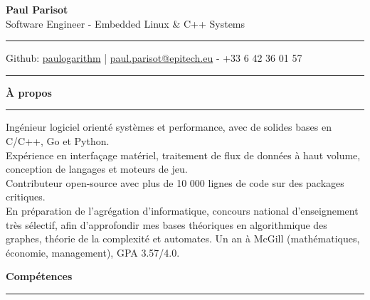 \documentclass[9pt]{extarticle}
\begin{document}
\begin{center}
    {\huge\bfseries Paul Parisot}
    \\[3pt]
    {\Large Software Engineer - Embedded Linux \& C++ Systems}
    \\[5pt]
\end{center}

\par\vspace{-10pt}
\rule{\linewidth}{0.4pt}
\par\vspace{-4pt}

\begin{center}
    Github: \href{https://github.com/paulogarithm}{paulogarithm} 
    \quad | \quad 
    \href{mailto:paul.parisot@epitech.eu}{paul.parisot@epitech.eu} - +33 6 42 36 01 57
\end{center}

\par\vspace{-10pt}
\rule{\linewidth}{0.4pt}
\par\vspace{5pt}


{\large\bfseries À propos}
\par\vspace{-8pt}
\rule{\linewidth}{0.4pt}
\par\vspace{5pt}

Ingénieur logiciel orienté systèmes et performance, avec de solides bases en C/C++, Go et Python.
\\
Expérience en interfaçage matériel, traitement de flux de données à haut volume, conception de langages et moteurs de jeu.
\\
Contributeur open-source avec plus de 10 000 lignes de code sur des packages critiques.
\\
En préparation de l'agrégation d'informatique, concours national d'enseignement très sélectif, afin d'approfondir mes bases théoriques en algorithmique des graphes, théorie de la complexité et automates. Un an à McGill (mathématiques, économie, management), GPA 3.57/4.0.
\par\vspace{5pt}


{\large\bfseries Compétences}
\par\vspace{-8pt}
\rule{\linewidth}{0.4pt}
\par\vspace{5pt}
\end{document}
